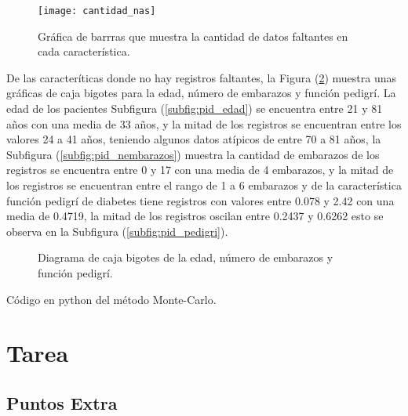 \begin{figure}[htp]
	\centering
		\texttt{[image: cantidad\_nas]}
	\caption{Gr\'afica de barrras que muestra la cantidad de datos faltantes en cada caracter\'istica.}
	\label{fig:missing}
\end{figure}

De las caracter\'iticas donde no hay registros faltantes, la Figura (\ref{fig:pid_edad_nembarazos_pedigri}) muestra unas gr\'aficas de caja bigotes para la edad, n\'umero de embarazos y funci\'on pedigr\'i. La edad de los pacientes Subfigura (\ref{subfig:pid_edad}) se encuentra entre 21 y 81 años con una media de 33 años, y la mitad de los registros se encuentran entre los valores 24 a 41 años, teniendo algunos datos at\'ipicos de entre 70 a 81 años, la Subfigura (\ref{subfig:pid_nembarazos}) muestra la cantidad de embarazos de los registros se encuentra entre 0 y 17 con una media de 4 embarazos, y la mitad de los registros se encuentran entre el rango de 1 a 6 embarazos y de la caracter\'istica funci\'on pedigr\'i de diabetes tiene registros con valores entre 0.078 y 2.42 con una media de 0.4719, la mitad de los registros oscilan entre 0.2437 y 0.6262 esto se observa en la Subfigura (\ref{subfig:pid_pedigri}).

\begin{figure}
	\centering
	 \qquad
	 \qquad
	 \qquad
	\caption{Diagrama de caja bigotes de la edad, n\'umero de embarazos y funci\'on pedigr\'i.}
	\label{fig:pid_edad_nembarazos_pedigri}
\end{figure}

\begin{table}[htpb]
	
	\caption{Código en python del método Monte-Carlo.}
	\label{cod:prac2}
\end{table}

\section{Tarea} \label{sec:tarea}



\subsection{Puntos Extra}






